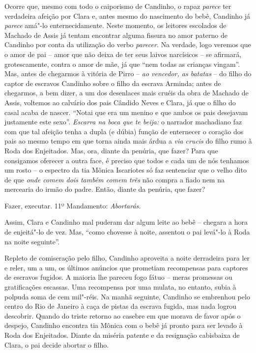 Ocorre que, mesmo com todo o caiporismo de Candinho, o rapaz
\emph{parece} ter verdadeira afeição por Clara e, antes mesmo do
nascimento do bebê, Candinho já \emph{parece} amá"-lo enternecidamente.
Neste momento, os leitores escolados de Machado de Assis já tentam
encontrar alguma fissura no amor paterno de Candinho por conta da
utilização do verbo \emph{parecer.} Na verdade, logo veremos que o amor
de pai -- amor que não deixa de ter seus laivos narcísicos -- se
afirmará, grotescamente, contra o amor de mãe, já que ``nem todas as
crianças vingam''. Mas, antes de chegarmos à vitória de Pirro --
\emph{ao vencedor, as batatas} -- do filho do captor de escravos
Candinho sobre o filho da escrava Arminda; antes de chegarmos, a bem
dizer, a um dos desenlaces mais cruéis da obra de Machado de Assis,
voltemos ao calvário dos pais Cândido Neves e Clara, já que o filho do
casal acaba de nascer. ``Notai que era um menino e que ambos os pais
desejavam justamente este sexo''. \emph{Escarra na boca que te beija:} o
narrador machadiano faz com que tal afeição tenha a dupla (e dúbia)
função de enternecer o coração dos pais ao mesmo tempo em que torna
ainda mais árdua a \emph{via crucis} do filho rumo à Roda dos
Enjeitados. Mas, ora, diante da penúria, que fazer? Para que consigamos
oferecer a outra face, é preciso que todos e cada um de nós tenhamos um
rosto -- o espectro da tia Mônica Iscariotes só faz sentenciar que o
velho dito de que \emph{onde comem dois também comem três} não compra a
fiado nem na mercearia do irmão do padre. Então, diante da penúria, que
fazer?

Fazer, executar. 11º Mandamento: \emph{Abortarás. }

Assim, Clara e Candinho mal puderam dar algum leite ao bebê -- chegara a
hora de enjeitá"-lo de vez. Mas, ``como chovesse à noite, assentou o pai
levá"-lo à Roda na noite seguinte''.

Repleto de comiseração pelo filho, Candinho aproveita a noite derradeira
para ler e reler, um a um, os últimos anúncios que prometiam recompensas
para captores de escravos fugidos. A maioria lhe pareceu fogo fátuo --
meras promessas ou gratificações escassas. Uma recompensa por uma
mulata, no entanto, subia à polpuda soma de cem mil"-réis. Na manhã
seguinte, Candinho se embrenhou pelo centro do Rio de Janeiro à caça de
pistas da escrava fugida, mas nada logrou descobrir. Quando do triste
retorno ao casebre em que morava de favor após o despejo, Candinho
encontra tia Mônica com o bebê já pronto para ser levado à Roda dos
Enjeitados. Diante da miséria patente e da resignação cabisbaixa de
Clara, o pai decide abortar o filho.

